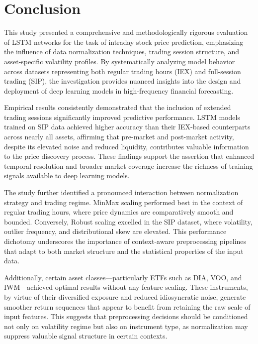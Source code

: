 \documentclass[letterpaper]{article}
\begin{document}
\section{Conclusion}

This study presented a comprehensive and methodologically rigorous evaluation of LSTM networks for the task of intraday stock price prediction, emphasizing the influence of data normalization techniques, trading session structure, and asset-specific volatility profiles. By systematically analyzing model behavior across datasets representing both regular trading hours (IEX) and full-session trading (SIP), the investigation provides nuanced insights into the design and deployment of deep learning models in high-frequency financial forecasting.

Empirical results consistently demonstrated that the inclusion of extended trading sessions significantly improved predictive performance. LSTM models trained on SIP data achieved higher accuracy than their IEX-based counterparts across nearly all assets, affirming that pre-market and post-market activity, despite its elevated noise and reduced liquidity, contributes valuable information to the price discovery process. These findings support the assertion that enhanced temporal resolution and broader market coverage increase the richness of training signals available to deep learning models.

The study further identified a pronounced interaction between normalization strategy and trading regime. MinMax scaling performed best in the context of regular trading hours, where price dynamics are comparatively smooth and bounded. Conversely, Robust scaling excelled in the SIP dataset, where volatility, outlier frequency, and distributional skew are elevated. This performance dichotomy underscores the importance of context-aware preprocessing pipelines that adapt to both market structure and the statistical properties of the input data.

Additionally, certain asset classes—particularly ETFs such as DIA, VOO, and IWM—achieved optimal results without any feature scaling. These instruments, by virtue of their diversified exposure and reduced idiosyncratic noise, generate smoother return sequences that appear to benefit from retaining the raw scale of input features. This suggests that preprocessing decisions should be conditioned not only on volatility regime but also on instrument type, as normalization may suppress valuable signal structure in certain contexts.
\end{document}
